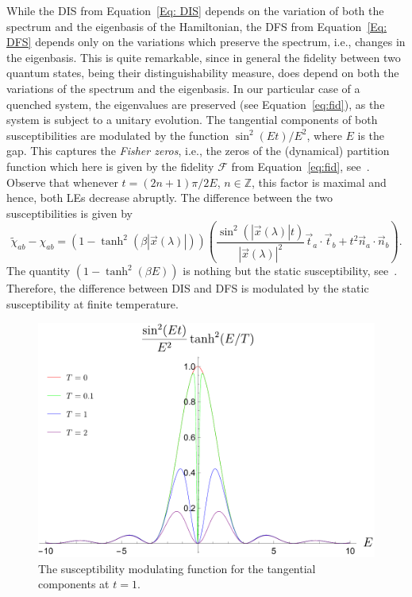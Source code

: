 While the DIS from Equation~\eqref{Eq: DIS} depends on the variation of both the spectrum and the eigenbasis of the Hamiltonian, the DFS from Equation~\eqref{Eq: DFS} depends only on the variations which preserve the spectrum, i.e., changes in the eigenbasis. This is quite remarkable, since in general the fidelity between two quantum states, being their distinguishability measure, does depend on both the variations of the spectrum and the eigenbasis. In our particular case of a quenched system, the eigenvalues are preserved (see Equation~\eqref{eq:fid}), as the system is subject to a unitary evolution. The tangential components of both susceptibilities are modulated by the function $\sin ^2 (Et)/ E^2$, where $E$ is the gap. This captures the \emph{Fisher zeros}, i.e., the zeros of the (dynamical) partition function which here is given by the fidelity $\mathcal F$ from Equation~\eqref{eq:fid}, see~\cite{yan:lee:52,lee:yan:52, fis:65}. Observe that whenever $t=(2n+1)\pi/2E$, $n\in\mathbb{Z}$, this factor is maximal and hence, both LEs decrease abruptly.
The difference between the two susceptibilities is given by
\begin{equation*}
\tilde{\chi}_{ab}-\chi_{ab}
=(1-\tanh^2(\beta|\vec{x}(\lambda)|))\left(\frac{\sin^2(|\vec{x}(\lambda)|t)}{|\vec{x}(\lambda)|^2}\vec{t}_a\cdot \vec{t}_{b} +t^2\vec{n}_a\cdot \vec{n}_b\right).
\end{equation*}
The quantity $(1-\tanh^2(\beta E))$ is nothing but the static susceptibility, see~\cite{pat:96}. Therefore, the difference between DIS and DFS is modulated by the static susceptibility at finite temperature. 

\begin{figure}[h]
\begin{center}
    \includegraphics[scale=0.5]{susceptibility.pdf}
    \caption{The susceptibility modulating function for the tangential components at $t=1$.}
\end{center}
\label{fig:suscep}
\end{figure}


